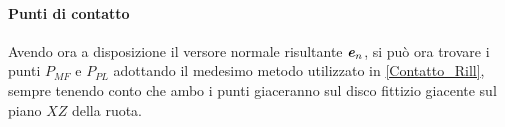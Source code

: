 \paragraph{Punti di contatto}
Avendo ora a disposizione il versore normale risultante $\textbf{\textit{e}}_n$, si può ora trovare i punti $P_{MF}$ e $P_{PL}$ adottando il medesimo metodo utilizzato in \ref{Contatto_Rill}, sempre tenendo conto che ambo i punti giaceranno sul disco fittizio giacente sul piano $XZ$ della ruota. 

